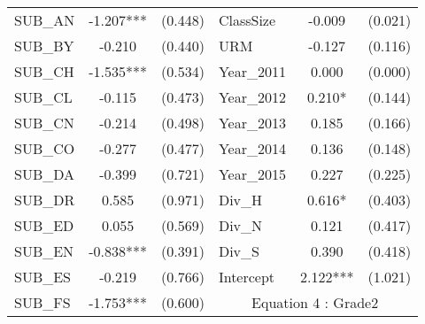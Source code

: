 \begin{table}[htb]
\begin{threeparttable}
\begin{tabular}{l c c|l c c}
    SUB\_AN                                      & -1.207***                 & (0.448)              & ClassSize           & -0.009                 & (0.021)              \\
    SUB\_BY                                      & -0.210                    & (0.440)              & URM                 & -0.127                 & (0.116)              \\
    SUB\_CH                                      & -1.535***                 & (0.534)              & Year\_2011               & 0.000                  & (0.000)              \\
    SUB\_CL                                      & -0.115                    & (0.473)              & Year\_2012               & 0.210*                 & (0.144)              \\
    SUB\_CN                                      & -0.214                    & (0.498)              & Year\_2013               & 0.185                  & (0.166)              \\
    SUB\_CO                                      & -0.277                    & (0.477)              & Year\_2014               & 0.136                  & (0.148)              \\
    SUB\_DA                                      & -0.399                    & (0.721)              & Year\_2015               & 0.227                  & (0.225)              \\
    SUB\_DR                                      & 0.585                     & (0.971)              & Div\_H              & 0.616*                 & (0.403)              \\
    SUB\_ED                                      & 0.055                     & (0.569)              & Div\_N              & 0.121                  & (0.417)              \\
    SUB\_EN                                      & -0.838***                 & (0.391)              & Div\_S              & 0.390                  & (0.418)              \\
    SUB\_ES                                      & -0.219                    & (0.766)              & Intercept           & 2.122***               & (1.021)              \\
    \cline{4-6}
    SUB\_FS                                      & -1.753***                 & (0.600)              & \multicolumn{3}{c}{Equation 4 : Grade2}                             \\
    \cline{4-6}

\end{tabular}
\end{threeparttable}
\end{table}
